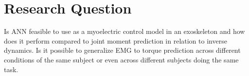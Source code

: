 \documentclass[../main.tex]{subfiles}
\begin{document}




\section{Research Question}
Is \ac{ANN} feasible to use as a myoelectric control model in an exoskeleton and how does it perform compared to joint moment prediction in relation to inverse dynamics. 
Is it possible to generalize \ac{EMG} to torque prediction across different conditions of the same subject or even across different subjects doing the same task.
\end{document}
